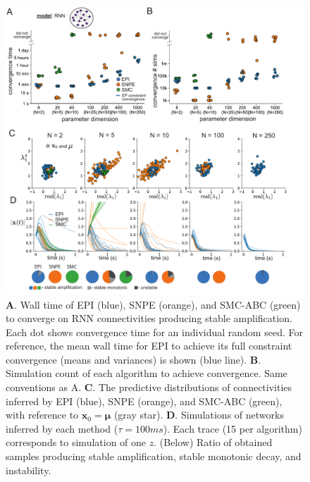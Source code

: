 \documentclass[11pt]{article}
\begin{document}
\begin{figure}
\begin{center}
\includegraphics[scale=.8]{figures/fig2/fig2.pdf}
\end{center}
\caption{ 
\textbf{A}. Wall time of EPI (blue), SNPE (orange), and SMC-ABC (green) to converge on RNN connectivities producing stable amplification.  
Each dot shows convergence time for an individual random seed.
For reference, the mean wall time for EPI to achieve its full constraint convergence (means and variances) is shown (blue line).
\textbf{B}. Simulation count of each algorithm to achieve convergence. Same conventions as A.
\textbf{C}. The predictive distributions of connectivities inferred by EPI (blue), SNPE (orange), and SMC-ABC (green), with reference to $\mathbf{x}_0 = \bm{\mu}$ (gray star).
\textbf{D}. Simulations of networks inferred by each method ($\tau=100ms$).  Each trace (15 per algorithm) corresponds to simulation of one $z$.  (Below) Ratio of obtained samples producing stable amplification, stable monotonic decay, and instability.
}
\label{fig:RNN}
\end{figure}
\end{document}
